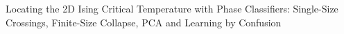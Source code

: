 Locating the 2D Ising Critical Temperature with Phase Classifiers: Single-Size Crossings, Finite-Size Collapse, PCA and Learning by Confusion
